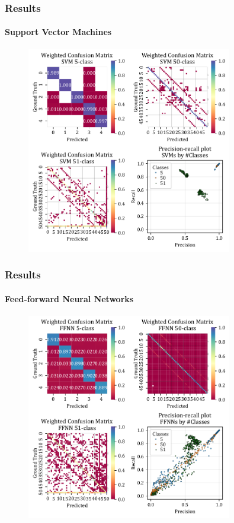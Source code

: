 \documentclass[xcolor={svgnames,table},10pt,fleqn]{beamer}
\begin{document}
\begin{frame}
    \frametitle{Results}
    \framesubtitle{Support Vector Machines}
    \begin{figure}[h]
        \centering
        \includegraphics[width=0.8\textwidth]{imgs/05_mean_conf_mat_svm.pdf}
    \end{figure}
\end{frame}

\begin{frame}
    \frametitle{Results}
    \framesubtitle{Feed-forward Neural Networks}
    \begin{figure}[h]
        \centering
        \includegraphics[width=0.8\textwidth]{imgs/05_mean_conf_mat_ffnn.pdf}
    \end{figure}
\end{frame}
\end{document}
